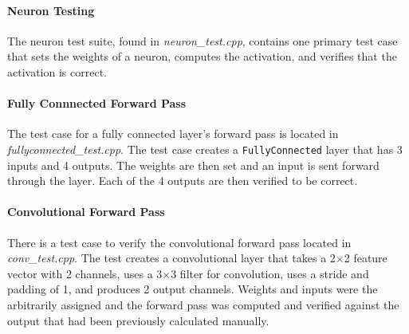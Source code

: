 \paragraph{Neuron Testing}
The neuron test suite, found in \textit{neuron\_test.cpp}, contains one primary test case that sets the weights of a neuron, computes the activation, and verifies that the activation is correct.

\paragraph{Fully Connnected Forward Pass}
The test case for a fully connected layer's forward pass is located in \textit{fullyconnected\_test.cpp}. The test case creates a \texttt{FullyConnected} layer that has 3 inputs and 4 outputs. The weights are then set and an input is sent forward through the layer. Each of the 4 outputs are then verified to be correct.

\paragraph{Convolutional Forward Pass}
There is a test case to verify the convolutional forward pass located in \textit{conv\_test.cpp}. The test creates a convolutional layer that takes a 2$\times$2 feature vector with 2 channels, uses a 3$\times$3 filter for convolution, uses a stride and padding of 1, and produces 2 output channels. Weights and inputs were the arbitrarily assigned and the forward pass was computed and verified against the output that had been previously calculated manually.

